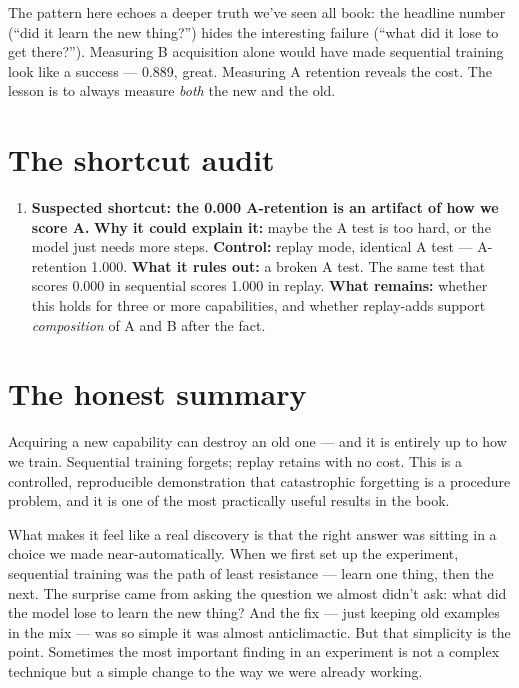 The pattern here echoes a deeper truth we've seen all book: the headline
number (``did it learn the new thing?'') hides the interesting failure
(``what did it lose to get there?''). Measuring B acquisition alone
would have made sequential training look like a success --- 0.889,
great. Measuring A retention reveals the cost. The lesson is to always
measure \emph{both} the new and the old.

\section{The shortcut audit}\label{the-shortcut-audit}

\begin{enumerate}
\def\labelenumi{\arabic{enumi}.}
\tightlist
\item
  \textbf{Suspected shortcut: the 0.000 A-retention is an artifact of
  how we score A.} \textbf{Why it could explain it:} maybe the A test is
  too hard, or the model just needs more steps. \textbf{Control:} replay
  mode, identical A test --- A-retention 1.000. \textbf{What it rules
  out:} a broken A test. The same test that scores 0.000 in sequential
  scores 1.000 in replay. \textbf{What remains:} whether this holds for
  three or more capabilities, and whether replay-adds support
  \emph{composition} of A and B after the fact.
\end{enumerate}

\section{The honest summary}\label{the-honest-summary}

Acquiring a new capability can destroy an old one --- and it is entirely
up to how we train. Sequential training forgets; replay retains with no
cost. This is a controlled, reproducible demonstration that catastrophic
forgetting is a procedure problem, and it is one of the most practically
useful results in the book.

What makes it feel like a real discovery is that the right answer was
sitting in a choice we made near-automatically. When we first set up the
experiment, sequential training was the path of least resistance ---
learn one thing, then the next. The surprise came from asking the
question we almost didn't ask: what did the model lose to learn the new
thing? And the fix --- just keeping old examples in the mix --- was so
simple it was almost anticlimactic. But that simplicity is the point.
Sometimes the most important finding in an experiment is not a complex
technique but a simple change to the way we were already working.
